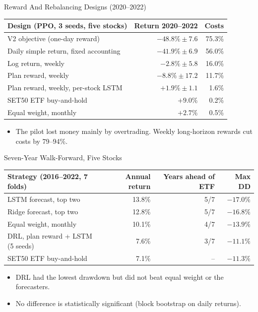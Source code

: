 \begin{frame}{Reward And Rebalancing Designs (2020--2022)}
\begin{center}
\scriptsize
\begin{tabular}{lrr}
\toprule
Design (PPO, 3 seeds, five stocks) & Return 2020--2022 & Costs \\
\midrule
V2 objective (one-day reward) & $-48.8\% \pm 7.6$ & 75.3\% \\
Daily simple return, fixed accounting & $-41.9\% \pm 6.9$ & 56.0\% \\
Log return, weekly & $-2.8\% \pm 5.8$ & 16.0\% \\
Plan reward, weekly & $-8.8\% \pm 17.2$ & 11.7\% \\
Plan reward, weekly, per-stock LSTM & $+1.9\% \pm 1.1$ & 1.6\% \\
\midrule
SET50 ETF buy-and-hold & $+9.0\%$ & 0.2\% \\
Equal weight, monthly & $+2.7\%$ & 0.5\% \\
\bottomrule
\end{tabular}
\end{center}
\begin{itemize}
  \item The pilot lost money mainly by overtrading. Weekly long-horizon rewards cut costs by 79--94\%.
\end{itemize}
\end{frame}

\begin{frame}{Seven-Year Walk-Forward, Five Stocks}
\begin{center}
\scriptsize
\begin{tabular}{lrrr}
\toprule
Strategy (2016--2022, 7 folds) & Annual return & Years ahead of ETF & Max DD \\
\midrule
LSTM forecast, top two & 13.8\% & 5/7 & $-17.0\%$ \\
Ridge forecast, top two & 12.8\% & 5/7 & $-16.8\%$ \\
Equal weight, monthly & 10.1\% & 4/7 & $-13.9\%$ \\
DRL, plan reward + LSTM (5 seeds) & 7.6\% & 3/7 & $-11.1\%$ \\
SET50 ETF buy-and-hold & 7.1\% & -- & $-11.3\%$ \\
\bottomrule
\end{tabular}
\end{center}
\begin{itemize}
  \item DRL had the lowest drawdown but did not beat equal weight or the forecasters.
  \item No difference is statistically significant (block bootstrap on daily returns).
\end{itemize}
\end{frame}


